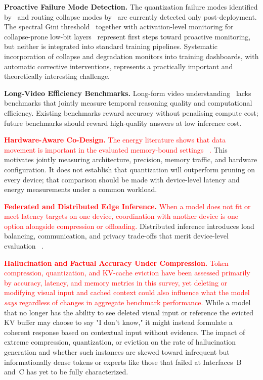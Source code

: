 \documentclass[10pt]{article}
\begin{document}
\textbf{Proactive Failure Mode Detection.}  The quantization failure modes identified
by~\citep{zhou2026signaldegradationcomputationcollapse} and routing collapse modes by~\citep{sha2026sparsemixtureofexpertsroutingvisual} are
currently detected only post-deployment.  The spectral Gini threshold~\citep{delibasoglu2026spectralmanifoldregularizationstable}
together with activation-level monitoring for collapse-prone low-bit layers~\citep{zhou2026signaldegradationcomputationcollapse} represent first steps
toward proactive monitoring, but neither is integrated into standard training pipelines.
Systematic incorporation of collapse and degradation monitors into training
dashboards, with automatic corrective interventions, represents a practically important
and theoretically interesting challenge.

\textbf{Long-Video Efficiency Benchmarks.}  Long-form video understanding~\citep{zou2024secondshoursreviewingmultimodal,faure2025hermestemporalcoherentlongformunderstanding} lacks benchmarks that jointly measure temporal reasoning
quality and computational efficiency.  Existing benchmarks reward accuracy without
penalising compute cost; future benchmarks should reward high-quality answers at low
inference cost.

\textcolor{red}{\textbf{Hardware-Aware Co-Design.}  The energy literature shows that
data movement is important in the evaluated memory-bound settings
~\citep{chung2026joulesgodiagnosinginference,yang2024doubleexponentialincreasesinferenceenergy,tschand2025mlperfpowerbenchmarkingenergy}.}
This motivates jointly measuring architecture, precision, memory traffic, and hardware
configuration.  It does not establish that quantization will outperform pruning on
every device; that comparison should be made with device-level latency and energy
measurements under a common workload.

\textcolor{red}{\textbf{Federated and Distributed Edge Inference.}  When a model does
not fit or meet latency targets on one device, coordination with another device is one
option alongside compression or offloading.}  Distributed inference introduces load
balancing, communication, and privacy trade-offs that merit device-level evaluation
~\citep{10906629,Wang_2025}.

\textcolor{red}{\textbf{Hallucination and Factual Accuracy Under Compression.} Token
compression, quantization, and KV-cache eviction have been assessed primarily by
accuracy, latency, and memory metrics in this survey, yet deleting or modifying visual
input and cached context could also influence what the model \emph{says} regardless of
changes in aggregate benchmark performance.} While a model that no longer has the ability to see
deleted visual input or reference the evicted KV buffer may choose to say "I don't
know," it might instead formulate a coherent response based on contextual input
without evidence. The impact of extreme compression, quantization, or eviction on the
rate of hallucination generation and whether such instances are skewed toward
infrequent but informationally dense tokens or experts like those that failed at
Interfaces~B and~C has yet to be fully characterized.
\end{document}
